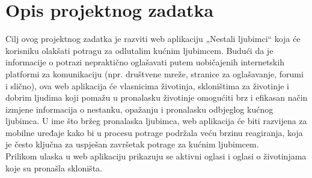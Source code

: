 \chapter{Opis projektnog zadatka}
		
		
		Cilj ovog projektnog zadatka je razviti web aplikaciju „Nestali ljubimci“ koja će korisniku olakšati potragu za odlutalim kućnim ljubimcem. Budući da je informacije o potrazi nepraktično oglašavati putem uobičajenih internetskih platformi za komunikaciju (npr. društvene mreže, stranice za oglašavanje, forumi i slično), ova web aplikacija će vlasnicima životinja, skloništima za životinje i dobrim ljudima koji pomažu u pronalasku životinje omogućiti brz i efikasan način izmjene informacija o nestanku, opažanju i pronalasku odbjeglog kućnog ljubimca. U ime što bržeg pronalaska ljubimca, web aplikacija će biti razvijena za mobilne uređaje  kako bi u procesu potrage podržala veću brzinu reagiranja, koja je često ključna za uspješan završetak potrage za kućnim ljubimcem.\\
		
		Prilikom ulaska u web aplikaciju prikazuju se aktivni oglasi i oglasi o životinjama koje su pronašla skloništa.\\
		
